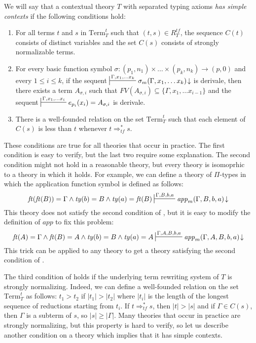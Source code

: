 \documentclass[reqno]{amsart}
\theoremstyle{definition}
\theoremstyle{remark}
\newcommand{\Term}{\mathrm{Term}}
\newcommand{\app}{\mathit{app}}
\newcommand{\ft}{\mathit{ft}}
\newcommand{\ty}{\mathit{ty}}
\numberwithin{figure}{section}
\begin{document}
\begin{defn}
We will say that a contextual theory $T$ with separated typing axioms \emph{has simple contexts} if the following conditions hold:
\begin{enumerate}
\item For all terms $t$ and $s$ in $\Term_T^t$ such that $(t,s) \in R^{tf}_T$, the sequence $C(t)$ consists of distinct variables and the set $C(s)$ consists of strongly normalizable terms.
\item For every basic function symbol $\sigma : (p_1,n_1) \times \ldots \times (p_k,n_k) \to (p,0)$ and every $1 \leq i \leq k$,
if the sequent $\sststile{}{\Gamma, x_1, \ldots x_k} \sigma_m(\Gamma, x_1, \ldots x_k)\!\downarrow$ is derivale,
then there exists a term $A_{\sigma,i}$ such that $FV(A_{\sigma,i}) \subseteq \{ \Gamma, x_1, \ldots x_{i-1} \}$ and the sequent $\sststile{}{\Gamma, x_1, \ldots x_i} e_{p_i}(x_i) = A_{\sigma,i}$ is derivale.
\item There is a well-founded relation on the set $\Term_T^t$ such that each element of $C(s)$ is less than $t$ whenever $t \Rightarrow_{tf}^* s$.
\end{enumerate}
\end{defn}
These conditions are true for all theories that occur in practice.
The first condition is easy to verify, but the last two require some explanation.
The second condition might not hold in a reasonable theory, but every theory is isomoprhic to a theory in which it holds.
For example, we can define a theory of $\Pi$-types in which the application function symbol is defined as follows:
\[ \ft(\ft(B)) = \Gamma \land \ty(b) = B \land \ty(a) = \ft(B) \sststile{}{\Gamma,B,b,a} \app_m(\Gamma,B,b,a)\!\downarrow \]
This theory does not satisfy the second condition of , but it is easy to modify the definition of $\app$ to fix this problem:
\[ \ft(A) = \Gamma \land \ft(B) = A \land \ty(b) = B \land \ty(a) = A \sststile{}{\Gamma,A,B,b,a} \app_m(\Gamma,A,B,b,a)\!\downarrow \]
This trick can be applied to any theory to get a theory satisfying the second condition of .

The third condition of  holds if the underlying term rewriting system of $T$ is strongly normalizing.
Indeed, we can define a well-founded relation on the set $\Term_T^t$ as follows: $t_1 > t_2$ if $|t_1| > |t_2|$ where $|t_i|$ is the length of the longest sequence of reductions starting from $t_i$.
If $t \Rightarrow_{tf}^* s$, then $|t| > |s|$ and if $\Gamma \in C(s)$, then $\Gamma$ is a subterm of $s$, so $|s| \geq |\Gamma|$.
Many theories that occur in practice are strongly normalizing, but this property is hard to verify, so let us describe another condition on a theory which implies that it has simple contexts.
\end{document}
